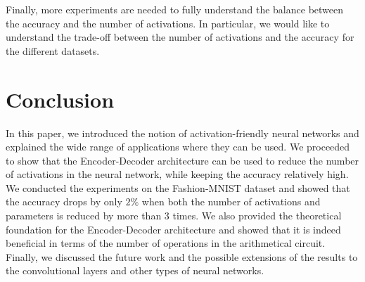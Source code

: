 \documentclass[12pt,a4paper,oneside]{book}
\theoremstyle{dplplain}
\theoremstyle{dpldefinition}
\theoremstyle{dplremark}
\begin{document}
Finally, more experiments are needed to fully understand the balance between the
accuracy and the number of activations. In particular, we would like to
understand the trade-off between the number of activations and the accuracy for
the different datasets.

\chapter{Conclusion}\label{section:conclusion}

In this paper, we introduced the notion of activation-friendly neural networks
and explained the wide range of applications where they can be used. We
proceeded to show that the Encoder-Decoder architecture can be used to reduce
the number of activations in the neural network, while keeping the accuracy
relatively high. We conducted the experiments on the Fashion-MNIST dataset and
showed that the accuracy drops by only $2\%$ when both the number of activations
and parameters is reduced by more than $3$ times. We also provided the
theoretical foundation for the Encoder-Decoder architecture and showed that it
is indeed beneficial in terms of the number of operations in the arithmetical
circuit. Finally, we discussed the future work and the possible extensions of
the results to the convolutional layers and other types of neural networks.

 

\end{document}
